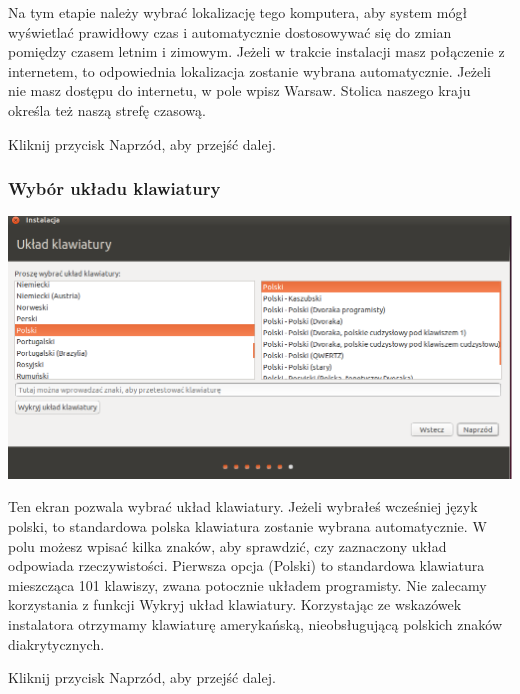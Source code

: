 Na tym etapie należy wybrać lokalizację tego komputera, aby system mógł wyświetlać prawidłowy czas i automatycznie dostosowywać się do zmian pomiędzy czasem letnim i zimowym. Jeżeli w trakcie instalacji masz połączenie z internetem, to odpowiednia lokalizacja zostanie wybrana automatycznie. Jeżeli nie masz dostępu do internetu, w pole wpisz \textcolor{ubuntu_orange}{Warsaw}. Stolica naszego kraju określa też naszą strefę czasową.
\begin{flushright}
Kliknij przycisk \textcolor{ubuntu_orange}{Naprzód}, aby przejść dalej.
\end{flushright}
\clearpage
\subsubsection{Wybór układu klawiatury}
\begin{center}
        \includegraphics[width=\linewidth]{images/instalator_klawiatura.png}
\end{center}

Ten ekran pozwala wybrać układ klawiatury. Jeżeli wybrałeś wcześniej język polski, to standardowa polska klawiatura zostanie wybrana automatycznie. W polu możesz wpisać kilka znaków, aby sprawdzić, czy zaznaczony układ odpowiada rzeczywistości. Pierwsza opcja (\textcolor{ubuntu_orange}{Polski}) to standardowa klawiatura mieszcząca 101 klawiszy, zwana potocznie układem programisty.
Nie zalecamy korzystania z funkcji \textcolor{ubuntu_orange}{Wykryj układ klawiatury}. Korzystając ze wskazówek instalatora otrzymamy klawiaturę amerykańską, nieobsługującą polskich znaków diakrytycznych.
\begin{flushright}
Kliknij przycisk \textcolor{ubuntu_orange}{Naprzód}, aby przejść dalej.
\end{flushright}
\clearpage

